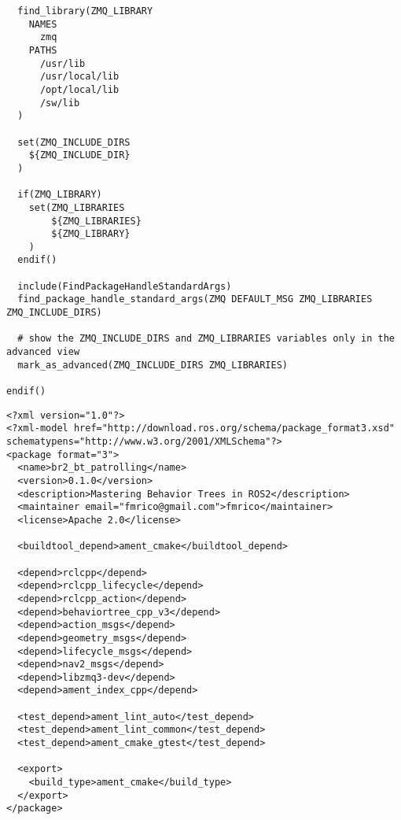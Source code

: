 \begin{tcolorbox}[sharp corners, colframe=gray!80, colback=LightGray, left=0pt, top=0pt, bottom=0pt, title=\texttt{br2\_bt\_patrolling/cmake/FindZMQ.cmake}]
\begin{verbatim}
  find_library(ZMQ_LIBRARY
    NAMES
      zmq
    PATHS
      /usr/lib
      /usr/local/lib
      /opt/local/lib
      /sw/lib
  )

  set(ZMQ_INCLUDE_DIRS
    ${ZMQ_INCLUDE_DIR}
  )

  if(ZMQ_LIBRARY)
    set(ZMQ_LIBRARIES
        ${ZMQ_LIBRARIES}
        ${ZMQ_LIBRARY}
    )
  endif()

  include(FindPackageHandleStandardArgs)
  find_package_handle_standard_args(ZMQ DEFAULT_MSG ZMQ_LIBRARIES ZMQ_INCLUDE_DIRS)

  # show the ZMQ_INCLUDE_DIRS and ZMQ_LIBRARIES variables only in the advanced view
  mark_as_advanced(ZMQ_INCLUDE_DIRS ZMQ_LIBRARIES)

endif()

    \end{verbatim}
    \end{tcolorbox}
  \normalsize

 \footnotesize
\begin{tcolorbox}[sharp corners, colframe=gray!80, colback=LightGray, left=0pt, top=0pt, bottom=0pt, title=\texttt{br2\_bt\_patrolling/package.xml}]
  \begin{verbatim}
<?xml version="1.0"?>
<?xml-model href="http://download.ros.org/schema/package_format3.xsd" schematypens="http://www.w3.org/2001/XMLSchema"?>
<package format="3">
  <name>br2_bt_patrolling</name>
  <version>0.1.0</version>
  <description>Mastering Behavior Trees in ROS2</description>
  <maintainer email="fmrico@gmail.com">fmrico</maintainer>
  <license>Apache 2.0</license>

  <buildtool_depend>ament_cmake</buildtool_depend>

  <depend>rclcpp</depend>
  <depend>rclcpp_lifecycle</depend>
  <depend>rclcpp_action</depend>
  <depend>behaviortree_cpp_v3</depend>
  <depend>action_msgs</depend>
  <depend>geometry_msgs</depend>
  <depend>lifecycle_msgs</depend>
  <depend>nav2_msgs</depend>
  <depend>libzmq3-dev</depend>
  <depend>ament_index_cpp</depend>

  <test_depend>ament_lint_auto</test_depend>
  <test_depend>ament_lint_common</test_depend>
  <test_depend>ament_cmake_gtest</test_depend>

  <export>
    <build_type>ament_cmake</build_type>
  </export>
</package>
    \end{verbatim}
    \end{tcolorbox}
  \normalsize

